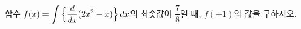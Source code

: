 함수 $f(x)=\displaystyle\int \Big\{\dfrac{d}{dx}(2x^2-x)\Big\}\mkern3mu dx$의 최솟값이 $\dfrac{7}{8}$일 때, $f(-1)$의 값을 구하시오.
